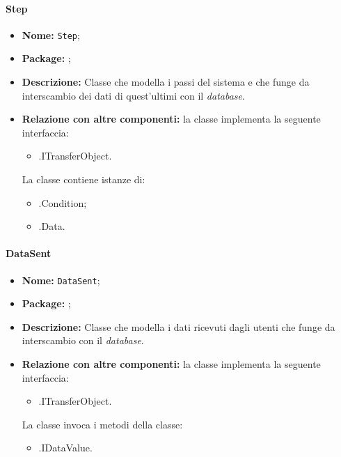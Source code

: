 \paragraph{Step}
\begin{itemize}
\item \textbf{Nome:} \texttt{Step};
\item \textbf{Package:} \texttt{\smodel{}};
\item \textbf{Descrizione:} Classe che modella i passi del sistema e che funge da interscambio dei dati di quest'ultimi con il \textit{database}.
\item \textbf{Relazione con altre componenti:} la classe implementa la seguente interfaccia:
		\begin{itemize}
			\item \smodel{}.ITransferObject.
		\end{itemize}
		La classe contiene istanze di:
		\begin{itemize}
			\item \smodel{}.Condition;
			\item \smodel{}.Data.
		\end{itemize}
\end{itemize}

\paragraph{DataSent}
\begin{itemize}
\item \textbf{Nome:} \texttt{DataSent};
\item \textbf{Package:} \texttt{\smodel{}};
\item \textbf{Descrizione:} Classe che modella i dati ricevuti dagli utenti che funge da interscambio  con il \textit{database}.
\item \textbf{Relazione con altre componenti:} la classe implementa la seguente interfaccia:
		\begin{itemize}
			\item \smodel{}.ITransferObject.
		\end{itemize}
				La classe invoca i metodi della classe:
		\begin{itemize}
			\item \smodel{}.IDataValue.
		\end{itemize}
\end{itemize}

